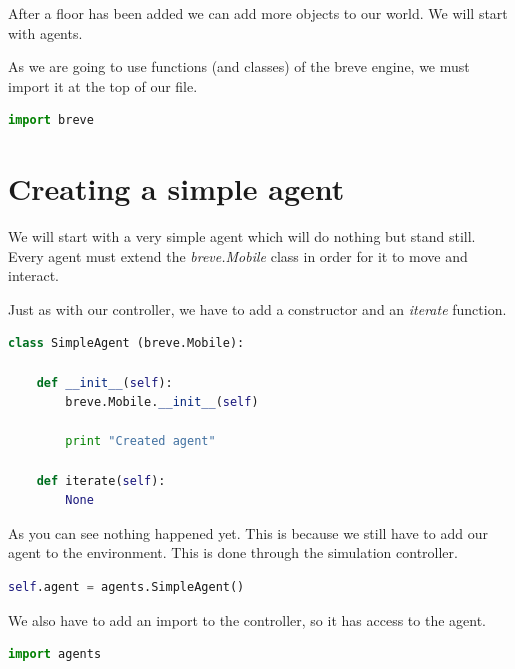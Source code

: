 After a floor has been added we can add more objects to our world. We will start with agents.


As we are going to use functions (and classes) of the breve engine, we must import it at the top of our file.

\begin{lstlisting}[language=Python]
import breve
\end{lstlisting}


\section{Creating a simple agent}

We will start with a very simple agent which will do nothing but stand still. Every agent must extend the \textit{breve.Mobile} class in order for it to move and interact.

Just as with our controller, we have to add a constructor and an \textit{iterate} function.

\begin{lstlisting}[language=Python]
class SimpleAgent (breve.Mobile):

	def __init__(self):
		breve.Mobile.__init__(self)

		print "Created agent"

	def iterate(self):
		None
\end{lstlisting}



As you can see nothing happened yet. This is because we still have to add our agent to the environment. This is done through the simulation controller.

\begin{lstlisting}[language=Python]
self.agent = agents.SimpleAgent()
\end{lstlisting}


We also have to add an import to the controller, so it has access to the agent.

\begin{lstlisting}[language=Python]
import agents
\end{lstlisting}

